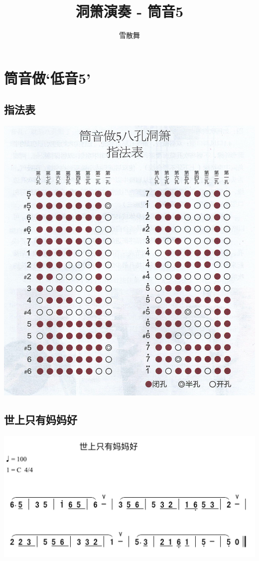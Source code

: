 \documentclass[cn,pad,chinese,chinesefont=nofont]{elegantbook}
\title{洞箫演奏 - 筒音5}
\author{雪散舞}
\date{\zhtoday}
\begin{document}
\maketitle
\frontmatter
\tableofcontents
\mainmatter

\centering
\chapter{筒音做‘低音5’}
\section{指法表}
\includegraphics[width=\textwidth]{dongxiao/Scan.jpeg}
\section{世上只有妈妈好}
	\includegraphics[width=\textwidth]{dongxiao/IMG_0854-世上只有妈妈好.png}
\end{document}

